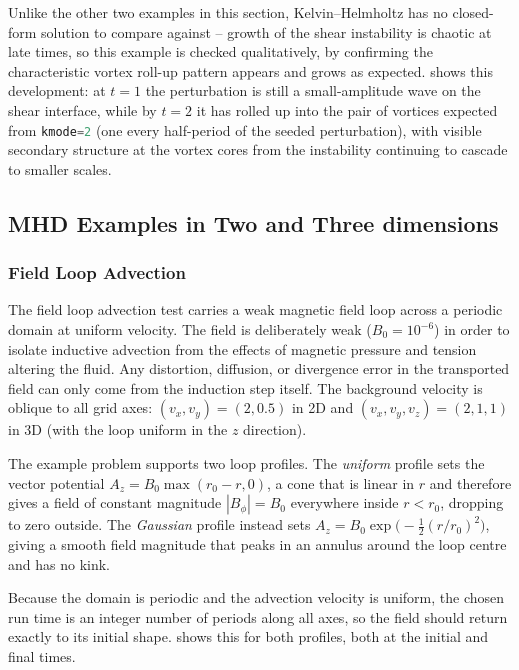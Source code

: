 \documentclass[11pt]{report}
\newcommand{\cpp}[1]{\lstinline[language=C++]{#1}}
\begin{document}
Unlike the other two examples in this section, Kelvin--Helmholtz has no closed-form solution to compare against -- growth of the shear instability is chaotic at late times, so this example is checked qualitatively, by confirming the characteristic vortex roll-up pattern appears and grows as expected.  shows this development: at $t=1$ the perturbation is still a small-amplitude wave on the shear interface, while by $t=2$ it has rolled up into the pair of vortices expected from \cpp{kmode=2} (one every half-period of the seeded perturbation), with visible secondary structure at the vortex cores from the instability continuing to cascade to smaller scales.



\subsection{MHD Examples in Two and Three dimensions}
\subsubsection{Field Loop Advection}
\label{sec:loop-advection}

The field loop advection test \citep{GardinerStone2005,GardinerStone2008} carries a weak magnetic field loop across a periodic domain at uniform velocity.
The field is deliberately weak ($B_0=10^{-6}$) in order to isolate inductive advection from the effects of magnetic pressure and tension altering the fluid.
Any distortion, diffusion, or divergence error in the transported field can only come from the induction step itself. 
The background velocity is oblique to all grid axes: $(v_x,v_y)=(2,0.5)$ in 2D and $(v_x,v_y,v_z)=(2,1,1)$ in 3D (with the loop uniform in the $z$ direction).

The example problem supports two loop profiles. The \emph{uniform} profile sets the vector potential $A_z = B_0\max(r_0-r,0)$, a cone that is linear in $r$ and therefore gives a field of constant magnitude $|B_\phi|=B_0$ everywhere inside $r<r_0$, dropping to zero outside. The \emph{Gaussian} profile instead sets $A_z=B_0\exp\!\big(-\tfrac12(r/r_0)^2\big)$, giving a smooth field magnitude that peaks in an annulus around the loop centre and has no kink.

Because the domain is periodic and the advection velocity is uniform, the chosen run time is an integer number of periods along all axes, so the field should return exactly to its initial shape.
  shows this for both profiles, both at the initial and final times.
\end{document}
